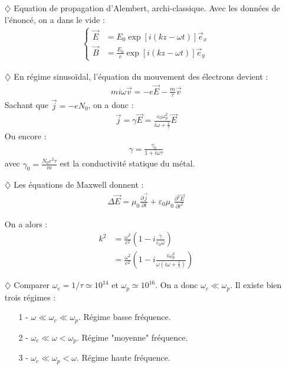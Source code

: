 \documentclass{report}
\begin{document}
\begin{itemize}

	\item[$\diamondsuit$] Equation de propagation d'Alembert, archi-classique. Avec les données de l'énoncé, on a dans le vide :
		\begin{align*}
		\begin{cases}
        \vec{E}&=E_0\exp[i(kz-\omega t)]\vec{e}_x \\
		\vec{B}&=\frac{E_0}{c}\exp[i(kz-\omega t)]\vec{e}_y
		\end{cases}  
		\end{align*}

	\item[$\diamondsuit$] En régime sinusoïdal, l'équation du mouvement des électrons devient :
	\begin{align*}
		mi\omega\vec{v}=-e\vec{E}-\frac{m}{\tau}\vec{v}
	\end{align*}
	Sachant que $\vec{j}=-eN_0$, on a donc :
	\begin{align*}
		\vec{j}=\gamma\vec{E}=\frac{\varepsilon_0\omega_p^2}{i\omega+\frac{1}{\tau}}\vec{E}
	\end{align*}
	Ou encore :
	\begin{align*}
		\gamma=\frac{\gamma_0}{1+i\omega\tau}
	\end{align*}
	avec $\gamma_0=\frac{N_0e^2\tau}{m}$ est la conductivité statique du métal.
	
	\item[$\diamondsuit$] Les équations de Maxwell donnent :
	\begin{align*}
		\Delta \vec{E} = \mu_0\frac{\partial \vec{j}}{\partial t}+\varepsilon_0\mu_0\frac{\partial^2\vec{E}}{\partial t^2}
	\end{align*}
	
	On a alors :
	\begin{align*}
			k^2 &= \frac{\omega^2}{c^2}\left(1-i\frac{\gamma}{\varepsilon_0\omega} \right) \\
		&= \frac{\omega^2}{c^2}\left(1-i\frac{i \omega_p^2}{\omega\left( i\omega+\frac{1}{\tau}\right) } \right)
	\end{align*}
	
	\item[$\diamondsuit$] Comparer $\omega_c=1/\tau\simeq10^{14}$ et $\omega_p\simeq10^{16}$. On a donc $\omega_c\ll\omega_p$. Il existe bien trois régimes : 
	\begin{itemize}
		\item[1 - ] $\omega\ll \omega_c \ll\omega_p$. Régime basse fréquence.
		\item[2 - ] $\omega_c\ll \omega < \omega_p$. Régime "moyenne" fréquence.
		\item[3 - ] $\omega_c \ll \omega_p < \omega$. Régime haute fréquence.
	\end{itemize}

\end{itemize}
\end{document}
